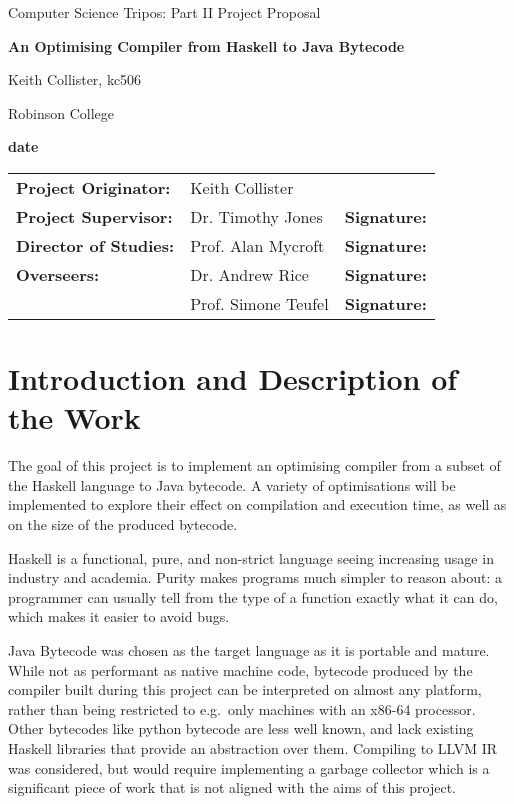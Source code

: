 \documentclass[12pt]{article}
\begin{document}
\thispagestyle{empty}

\centerline{\large Computer Science Tripos: Part II Project Proposal}
\vspace{0.4in}
\centerline{\Large\bf An Optimising Compiler from Haskell to Java Bytecode}
\vspace{0.3in}

\centerline{Keith Collister, kc506}
\centerline{Robinson College}

\centerline{\large \textbf{date}}

\vspace{0.8in}

\begin{tabular}{ p{4cm} p{4.5cm} l }
{\bf Project Originator:} & Keith Collister & \\[3mm]
{\bf Project Supervisor:} & Dr. Timothy Jones & {\bf Signature:} \\[3mm]
{\bf Director of Studies:} & Prof. Alan Mycroft & {\bf Signature:} \\[3mm]
{\bf Overseers:} & Dr. Andrew Rice & {\bf Signature:} \\[3mm]
                 & Prof. Simone Teufel & {\bf Signature:} \\[3mm]
\end{tabular}

\vspace{0.3in}


\section*{Introduction and Description of the Work}

The goal of this project is to implement an optimising compiler from a subset of the Haskell language to Java bytecode.
A variety of optimisations will be implemented to explore their effect on compilation and execution time, as well as on
the size of the produced bytecode.

Haskell is a functional, pure, and non-strict language seeing increasing usage in industry and academia. Purity makes
programs much simpler to reason about: a programmer can usually tell from the type of a function exactly what it can do,
which makes it easier to avoid bugs.

Java Bytecode was chosen as the target language as it is portable and mature. While not as performant as native machine
code, bytecode produced by the compiler built during this project can be interpreted on almost any platform, rather than
being restricted to e.g.\ only machines with an x86-64 processor. Other bytecodes like python bytecode are less well
known, and lack existing Haskell libraries that provide an abstraction over them. Compiling to LLVM IR was considered,
but would require implementing a garbage collector which is a significant piece of work that is not aligned with the
aims of this project.
\end{document}
